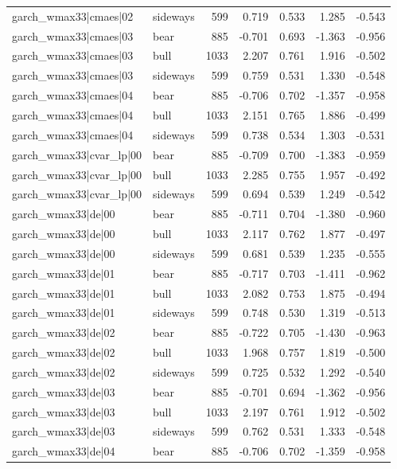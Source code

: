 \begin{table}
\begin{tabular}{llrrrrr}
garch\_wmax33|cmaes|02 & sideways & 599 & 0.719 & 0.533 & 1.285 & -0.543 \\
garch\_wmax33|cmaes|03 & bear & 885 & -0.701 & 0.693 & -1.363 & -0.956 \\
garch\_wmax33|cmaes|03 & bull & 1033 & 2.207 & 0.761 & 1.916 & -0.502 \\
garch\_wmax33|cmaes|03 & sideways & 599 & 0.759 & 0.531 & 1.330 & -0.548 \\
garch\_wmax33|cmaes|04 & bear & 885 & -0.706 & 0.702 & -1.357 & -0.958 \\
garch\_wmax33|cmaes|04 & bull & 1033 & 2.151 & 0.765 & 1.886 & -0.499 \\
garch\_wmax33|cmaes|04 & sideways & 599 & 0.738 & 0.534 & 1.303 & -0.531 \\
garch\_wmax33|cvar\_lp|00 & bear & 885 & -0.709 & 0.700 & -1.383 & -0.959 \\
garch\_wmax33|cvar\_lp|00 & bull & 1033 & 2.285 & 0.755 & 1.957 & -0.492 \\
garch\_wmax33|cvar\_lp|00 & sideways & 599 & 0.694 & 0.539 & 1.249 & -0.542 \\
garch\_wmax33|de|00 & bear & 885 & -0.711 & 0.704 & -1.380 & -0.960 \\
garch\_wmax33|de|00 & bull & 1033 & 2.117 & 0.762 & 1.877 & -0.497 \\
garch\_wmax33|de|00 & sideways & 599 & 0.681 & 0.539 & 1.235 & -0.555 \\
garch\_wmax33|de|01 & bear & 885 & -0.717 & 0.703 & -1.411 & -0.962 \\
garch\_wmax33|de|01 & bull & 1033 & 2.082 & 0.753 & 1.875 & -0.494 \\
garch\_wmax33|de|01 & sideways & 599 & 0.748 & 0.530 & 1.319 & -0.513 \\
garch\_wmax33|de|02 & bear & 885 & -0.722 & 0.705 & -1.430 & -0.963 \\
garch\_wmax33|de|02 & bull & 1033 & 1.968 & 0.757 & 1.819 & -0.500 \\
garch\_wmax33|de|02 & sideways & 599 & 0.725 & 0.532 & 1.292 & -0.540 \\
garch\_wmax33|de|03 & bear & 885 & -0.701 & 0.694 & -1.362 & -0.956 \\
garch\_wmax33|de|03 & bull & 1033 & 2.197 & 0.761 & 1.912 & -0.502 \\
garch\_wmax33|de|03 & sideways & 599 & 0.762 & 0.531 & 1.333 & -0.548 \\
garch\_wmax33|de|04 & bear & 885 & -0.706 & 0.702 & -1.359 & -0.958 \\

\end{tabular}
\end{table}
